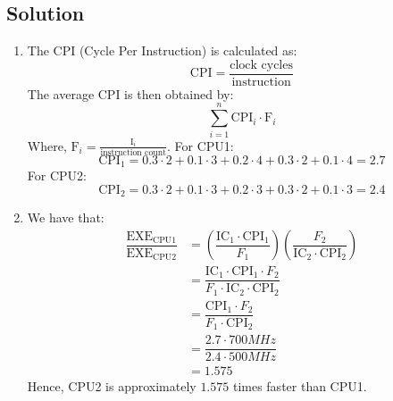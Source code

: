 \subsection{Solution}
\begin{enumerate}
    \item The CPI (Cycle Per Instruction) is calculated as:
        \[\text{CPI}=\dfrac{\text{clock cycles}}{\text{instruction}}\]
        The average CPI is then obtained by:
        \[\sum_{i=1}^{n}\text{CPI}_i \cdot \text{F}_i\]
        Where, $\text{F}_i=\frac{\text{I}_i}{\text{instruction count}}$. 
        For CPU1:
        \[\text{CPI}_1=0.3 \cdot 2 + 0.1 \cdot 3 + 0.2 \cdot 4 + 0.3 \cdot 2 + 0.1 \cdot 4=2.7\]
        For CPU2:
        \[\text{CPI}_2=0.3 \cdot 2 + 0.1 \cdot 3 + 0.2 \cdot 3 + 0.3 \cdot 2 + 0.1 \cdot 3=2.4\]
    \item We have that: 
        \begin{align*}
            \dfrac{{\text{EXE}_{\text{CPU1}}}}{{\text{EXE}_{\text{CPU2}}}}  &=\left( \dfrac{\text{IC}_1 \cdot \text{CPI}_1}{F_1} \right)\left( \dfrac{F_2}{\text{IC}_2 \cdot \text{CPI}_2} \right) \\
                                                                            &=\dfrac{\text{IC}_1 \cdot \text{CPI}_1 \cdot F_2}{F_1 \cdot \text{IC}_2 \cdot \text{CPI}_2} \\
                                                                            &=\dfrac{\text{CPI}_1 \cdot F_2}{F_1 \cdot \text{CPI}_2} \\
                                                                            &=\dfrac{2.7 \cdot 700 MHz}{2.4 \cdot 500 MHz} \\
                                                                            &=1.575
        \end{align*}
        Hence, CPU2 is approximately $1.575$ times faster than CPU1.
\end{enumerate}